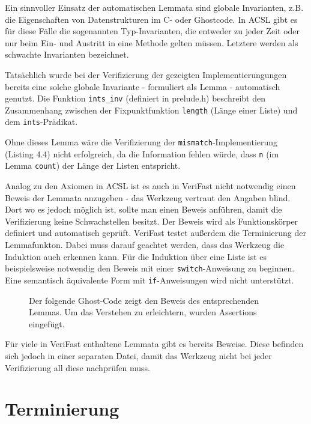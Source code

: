 Ein sinnvoller Einsatz der automatischen Lemmata sind globale Invarianten, z.B. die Eigenschaften von Datenstrukturen
im C- oder Ghostcode. In ACSL gibt es für diese Fälle die sogenannten Typ-Invarianten, die entweder zu jeder Zeit oder
nur beim Ein- und Austritt in eine Methode gelten müssen. Letztere werden als schwachte Invarianten bezeichnet.

Tatsächlich wurde bei der Verifizierung der gezeigten Implementierungungen bereits eine solche
globale Invariante - formuliert als Lemma - automatisch genutzt. Die Funktion \lstinline{ints_inv}
(definiert in prelude.h) beschreibt den Zusammenhang zwischen der Fixpunktfunktion \texttt{length}
(Länge einer Liste) und dem \lstinline{ints}-Prädikat.



Ohne dieses Lemma wäre die Verifizierung der \lstinline{mismatch}-Implementierung (Listing 4.4)
nicht erfolgreich, da die Information fehlen würde, dass \lstinline{n} (im Lemma \lstinline{count})
der Länge der Listen entspricht.

Analog zu den Axiomen in ACSL ist es auch in VeriFast nicht notwendig einen Beweis der Lemmata anzugeben -
das Werkzeug vertraut den Angaben blind. Dort wo es jedoch möglich ist, sollte man einen Beweis anführen,
damit die Verifizierung keine Schwachstellen besitzt.
Der Beweis wird als Funktionskörper definiert und automatisch geprüft. VeriFast testet außerdem die
Terminierung der Lemmafunkton. 
Dabei muss  darauf geachtet werden, dass das Werkzeug die Induktion auch 
erkennen kann. Für die Induktion über eine Liste ist es beispielsweise notwendig den Beweis mit einer 
\texttt{switch}-Anweisung zu beginnen. Eine semantisch äquivalente Form mit \texttt{if}-Anweisungen wird 
nicht unterstützt.
\begin{figure}[H]
Der folgende Ghost-Code zeigt den Beweis des entsprechenden Lemmas. Um das Verstehen zu erleichtern,
wurden Assertions eingefügt.

\end{figure} 
Für viele in VeriFast enthaltene Lemmata gibt es bereits Beweise. Diese befinden sich jedoch in einer separaten
Datei, damit das Werkzeug nicht bei jeder Verifizierung all diese nachprüfen muss.

\section{Terminierung}


